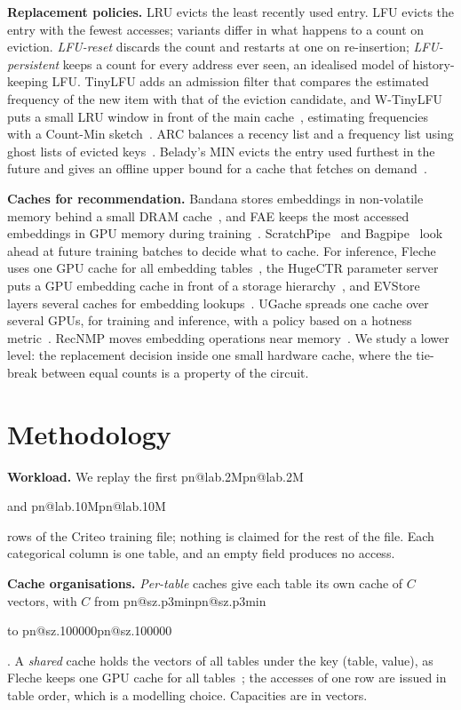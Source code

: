 \documentclass[conference,10pt]{IEEEtran}
\makeatletter
\newcommand{\R}[1]{\ifcsname pn@#1\endcsname\csname pn@#1\endcsname\else
  \PackageError{paper}{number key '#1' is not defined in macros.tex}{Run tools/make_paper_macros.py}\fi}
\makeatother
\begin{document}
\textbf{Replacement policies.} LRU evicts the least recently used entry. LFU evicts the entry with the fewest
accesses; variants differ in what happens to a count on eviction. \emph{LFU-reset} discards the count and restarts
at one on re-insertion; \emph{LFU-persistent} keeps a count for every address ever seen, an idealised model of
history-keeping LFU. TinyLFU adds an admission filter that compares the estimated frequency of the new item with
that of the eviction candidate, and W-TinyLFU puts a small LRU window in front of the main
cache~\cite{einziger2017tinylfu}, estimating frequencies with a Count-Min sketch~\cite{cormode2005countmin}. ARC
balances a recency list and a frequency list using ghost lists of evicted keys~\cite{megiddo2003arc}. Belady's MIN
evicts the entry used furthest in the future and gives an offline upper bound for a cache that fetches on
demand~\cite{belady1966study}.

\textbf{Caches for recommendation.} Bandana stores embeddings in non-volatile memory behind a small DRAM
cache~\cite{eisenman2019bandana}, and FAE keeps the most accessed embeddings in GPU memory during
training~\cite{adnan2022fae}. ScratchPipe~\cite{kwon2022scratchpipe} and Bagpipe~\cite{agarwal2023bagpipe} look
ahead at future training batches to decide what to cache. For inference, Fleche uses one GPU cache for all embedding
tables~\cite{xie2022fleche}, the HugeCTR parameter server puts a GPU embedding cache in front of a storage
hierarchy~\cite{wei2022hps}, and EVStore layers several caches for embedding lookups~\cite{kurniawan2023evstore}.
UGache spreads one cache over several GPUs, for training and inference, with a policy based on a hotness
metric~\cite{song2023ugache}.
RecNMP moves embedding operations near memory~\cite{ke2020recnmp}. We study a lower level: the replacement decision
inside one small hardware cache, where the tie-break between equal counts is a property of the circuit.

\section{Methodology}\label{sec:method}
\textbf{Workload.} We replay the first \R{lab.2M} and \R{lab.10M} rows of the Criteo training file; nothing is
claimed for the rest of the file. Each categorical column is one table, and an empty field produces no access.

\textbf{Cache organisations.} \emph{Per-table} caches give each table its own cache of $C$ vectors, with $C$ from
\R{sz.p3min} to \R{sz.100000}. A \emph{shared} cache holds the vectors of all tables under the key (table, value), as
Fleche keeps one GPU cache for all tables~\cite{xie2022fleche}; the accesses of one row are issued in table order,
which is a modelling choice. Capacities are in vectors.
\end{document}
